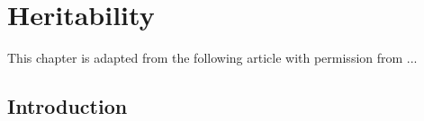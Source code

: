 \chapter{Heritability} \label{chap:heritability}




\begin{singlespace}         %
    This chapter is adapted from the following article with permission from ...
    
\end{singlespace} 


\section{Introduction}

